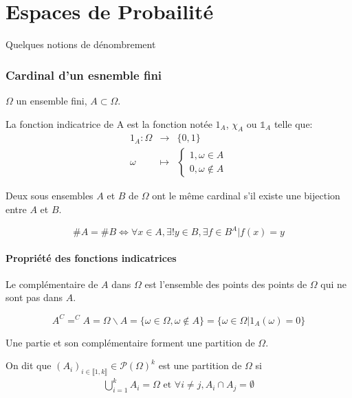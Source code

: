 \part{Espaces de Probailité}
  Quelques notions de dénombrement
  \section{Cardinal d'un esnemble fini}
  $\Omega$ un ensemble fini, $A\subset\Omega$.
  \begin{definition}
    La fonction indicatrice de A est la fonction notée $1_A$, $\chi_A$ ou
    $\mathbb{1}_A$ telle que:
    \begin{eqnarray*}
      1_A : \Omega &\rightarrow& \{0, 1\}\\
            \omega &\mapsto& \begin{cases}
                            1, \omega\in A\\
                            0, \omega\notin A
                          \end{cases}
    \end{eqnarray*}
  \end{definition}

  \begin{proposition}
    Deux sous ensembles $A$ et $B$ de $\Omega$ ont le même cardinal s'il existe
    une bijection entre $A$ et $B$.

    \[\# A = \# B \iff \forall x \in A, \exists ! y \in B, \exists f\in B^A | f(x)=y\]

  \end{proposition}

  \subsection{Propriété des fonctions indicatrices}
  \label{sub:Propriété des fonctions indicatrices}
    \begin{definition}
      Le complémentaire de $A$ dans $\Omega$ est l'ensemble des points des
      points de $\Omega$ qui ne sont pas dans $A$.

      \[A^C = ^CA = \Omega\backslash A = \{\omega\in\Omega, \omega\notin A\}
                                       = \{\omega\in\Omega|1_A(\omega)=0\}
      \]

    \end{definition}

    Une partie et son complémentaire forment une partition de $\Omega$.

    \begin{definition}
      On dit que $\left(A_i\right)_{i\in\llbracket 1,k\rrbracket} \in \mathcal{P}(\Omega)^k$
      est une partition de $\Omega$ si
      \begin{eqnarray*}
        \bigcup_{i=1}^k A_i = \Omega \text{ et } \forall i\neq j, A_i\cap A_j = \emptyset
      \end{eqnarray*}
    \end{definition}
